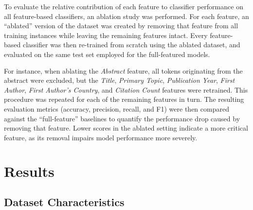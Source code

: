 \documentclass[pdflatex,sn-mathphys-num]{sn-jnl}%
\begin{document}
To evaluate the relative contribution of each feature to classifier performance on all feature-based classifiers, an ablation study was performed. For each feature, an ``ablated'' version of the dataset was created by removing that feature from all training instances while leaving the remaining features intact. Every feature-based classifier was then re-trained from scratch using the ablated dataset, and evaluated on the same test set employed for the full-featured models.

For instance, when ablating the \emph{Abstract} feature, all tokens originating from the abstract were excluded, but the \emph{Title}, \emph{Primary Topic}, \emph{Publication Year}, \emph{First Author}, \emph{First Author’s Country}, and \emph{Citation Count} features were retrained. This procedure was repeated for each of the remaining features in turn. The resulting evaluation metrics (accuracy, precision, recall, and F1) were then compared against the ``full-feature'' baselines to quantify the performance drop caused by removing that feature. Lower scores in the ablated setting indicate a more critical feature, as its removal impairs model performance more severely.


\section{Results}



\subsection{Dataset Characteristics}\label{sec3}
\end{document}
